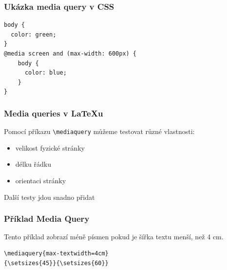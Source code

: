 \begin{frame}[fragile]
\frametitle{Ukázka media query v CSS}
\begin{verbatim}
body {
  color: green;
}
@media screen and (max-width: 600px) {
    body {
      color: blue;
    }
}
\end{verbatim}
          
\end{frame}

\begin{frame}[fragile]
  \frametitle{Media queries v \LaTeX u}
    Pomocí příkazu \verb|\mediaquery| můžeme testovat různé vlastnosti:
  
    \begin{itemize}
  \item velikost fyzické stránky
  \item délku řádku
  \item orientaci stránky
\end{itemize}

Další testy jdou snadno přidat

\end{frame}

\begin{frame}[fragile]

  \frametitle{Příklad Media Query}

  Tento příklad zobrazí méně písmen pokud je šířka textu menší, než 4 cm.

  
\begin{verbatim}
\mediaquery{max-textwidth=4cm}
{\setsizes{45}}{\setsizes{60}}
\end{verbatim}
\begin{columns}
  \begin{column}{0.5\textwidth}
\end{column}
  \begin{column}{0.5\textwidth}
\end{column}
\end{columns}

\end{frame}


